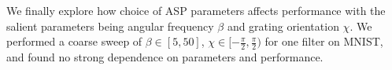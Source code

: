 \documentclass[10pt,twocolumn,letterpaper]{article}
\begin{document}

We finally explore how choice of ASP parameters affects performance with the salient parameters being angular frequency $\beta$ and grating orientation $\chi$. We performed a coarse sweep of $\beta \in [5, 50]$, $\chi \in [-\frac{\pi}{2}, \frac{\pi}{2})$ for one filter on MNIST, and found no strong dependence on parameters and performance. 
\end{document}
